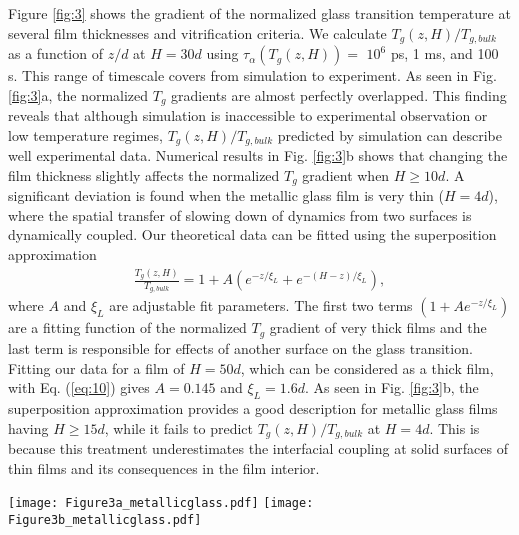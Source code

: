 \documentclass[twocolumn,preprintnumbers,amsmath,amssymb,superscriptaddress]{revtex4}
\begin{document}
Figure \ref{fig:3} shows the gradient of the normalized glass transition temperature at several film thicknesses and vitrification criteria. We calculate $T_{g}(z,H)/T_{g,bulk}$ as a function of $z/d$ at $H = 30d$ using $\tau_\alpha(T_g(z,H))=$ $10^{6}$ ps, 1 ms, and 100 s. This range of timescale covers from simulation to experiment. As seen in Fig. \ref{fig:3}a, the normalized $T_g$ gradients are almost perfectly overlapped. This finding reveals that although simulation is inaccessible to experimental observation or low temperature regimes, $T_{g}(z,H)/T_{g,bulk}$ predicted by simulation can describe well experimental data. Numerical results in Fig. \ref{fig:3}b shows that changing the film thickness slightly affects the normalized $T_g$ gradient when $H \geq 10d$. A significant deviation is found when the metallic glass film is very thin ($H = 4d$), where the spatial transfer of slowing down of dynamics from two surfaces is dynamically coupled. Our theoretical data can be fitted using the superposition approximation \cite{17}
\begin{eqnarray}
\frac{T_{g}(z,H)}{T_{g,bulk}}=1+A\left(e^{-z/\xi_L}+e^{-(H-z)/\xi_L}\right),
\label{eq:10}
\end{eqnarray}
where $A$ and $\xi_L$ are adjustable fit parameters. The first two terms $(1+Ae^{-z/\xi_L})$ are a fitting function of the normalized $T_g$ gradient of very thick films and the last term is responsible for effects of another surface on the glass transition. Fitting our data for a film of $H = 50d$, which can be considered as a thick film, with Eq. (\ref{eq:10}) gives $A =0.145$ and $\xi_L=1.6d$. As seen in Fig. \ref{fig:3}b, the superposition approximation provides a good description for metallic glass films having $H \geq 15d$, while it fails to predict $T_{g}(z,H)/T_{g,bulk}$ at $H = 4d$. This is because this treatment underestimates the interfacial coupling at solid surfaces of thin films and its consequences in the film interior.

\begin{figure*}[htp]
\texttt{[image: Figure3a\_metallicglass.pdf]}
\texttt{[image: Figure3b\_metallicglass.pdf]}
\caption{(Color online) (a) The local glass transition temperature normalized by its bulk counterpart calculated using different vitrification time scales ranging from $10^6$ ps to 100s at $H = 30d$. (b) The local glass transition temperature normalized by its bulk counterpart (defined by the vitrification time scale of 100 s) in different film thicknesses. Solid data points and dashed curve corresponds to theoretical calculations and fitting curves.}
\label{fig:3}
\end{figure*}
\end{document}
